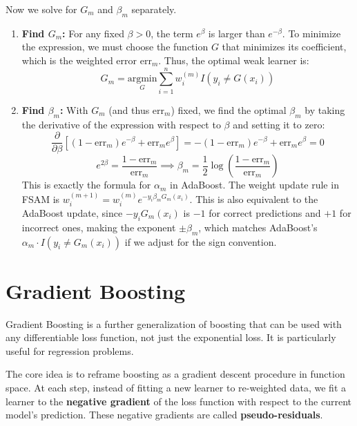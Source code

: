 \documentclass{article}
\begin{document}
\begin{multicols}{2}
	Now we solve for $G_m$ and $\beta_m$ separately.
	\begin{enumerate}
		\item \textbf{Find $G_m$:} For any fixed $\beta > 0$, the term $e^{\beta}$ is larger than $e^{-\beta}$. To minimize the expression, we must choose the function $G$ that minimizes its coefficient, which is the weighted error $\text{err}_m$. Thus, the optimal weak learner is:
		      $$ G_m = \underset{G}{\text{argmin}} \sum_{i=1}^{n} w_i^{(m)} I(y_i \neq G(x_i)) $$
		\item \textbf{Find $\beta_m$:} With $G_m$ (and thus $\text{err}_m$) fixed, we find the optimal $\beta_m$ by taking the derivative of the expression with respect to $\beta$ and setting it to zero:
		      $$ \frac{\partial}{\partial \beta} [ (1 - \text{err}_m) e^{-\beta} + \text{err}_m e^{\beta} ] = -(1 - \text{err}_m) e^{-\beta} + \text{err}_m e^{\beta} = 0 $$
		      $$ e^{2\beta} = \frac{1 - \text{err}_m}{\text{err}_m} \implies \beta_m = \frac{1}{2} \log\left(\frac{1 - \text{err}_m}{\text{err}_m}\right) $$
		      This is exactly the formula for $\alpha_m$ in AdaBoost. The weight update rule in FSAM is $w_i^{(m+1)} = w_i^{(m)} e^{-y_i \beta_m G_m(x_i)}$. This is also equivalent to the AdaBoost update, since $-y_i G_m(x_i)$ is $-1$ for correct predictions and $+1$ for incorrect ones, making the exponent $\pm \beta_m$, which matches AdaBoost's $\alpha_m \cdot I(y_i \neq G_m(x_i))$ if we adjust for the sign convention.
	\end{enumerate}

	\section{Gradient Boosting}
	Gradient Boosting is a further generalization of boosting that can be used with any differentiable loss function, not just the exponential loss. It is particularly useful for regression problems.

	The core idea is to reframe boosting as a gradient descent procedure in function space. At each step, instead of fitting a new learner to re-weighted data, we fit a learner to the \textbf{negative gradient} of the loss function with respect to the current model's prediction. These negative gradients are called \textbf{pseudo-residuals}.


\end{multicols}
\end{document}
